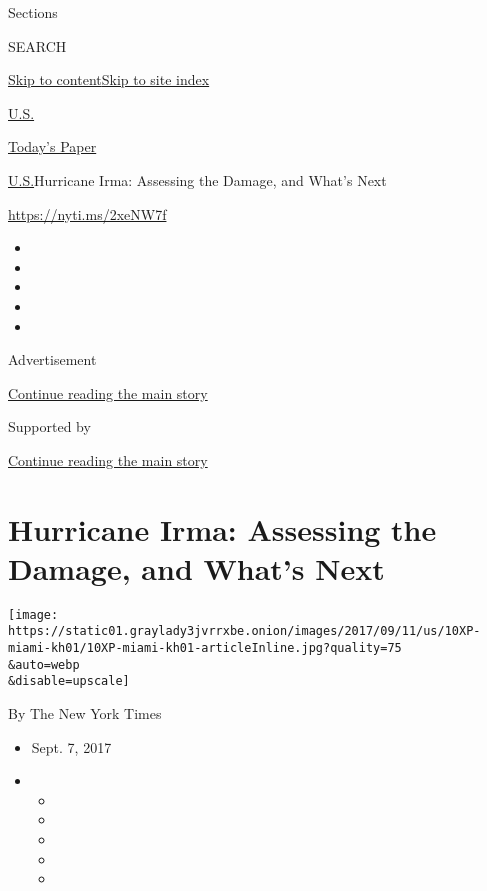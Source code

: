 Sections

SEARCH

\protect\hyperlink{site-content}{Skip to
content}\protect\hyperlink{site-index}{Skip to site index}

\href{https://www.nytimes3xbfgragh.onion/section/us}{U.S.}

\href{https://myaccount.nytimes3xbfgragh.onion/auth/login?response_type=cookie\&client_id=vi}{}

\href{https://www.nytimes3xbfgragh.onion/section/todayspaper}{Today's
Paper}

\href{/section/us}{U.S.}\textbar{}Hurricane Irma: Assessing the Damage,
and What's Next

\url{https://nyti.ms/2xeNW7f}

\begin{itemize}
\item
\item
\item
\item
\item
\end{itemize}

Advertisement

\protect\hyperlink{after-top}{Continue reading the main story}

Supported by

\protect\hyperlink{after-sponsor}{Continue reading the main story}

\hypertarget{hurricane-irma-assessing-the-damage-and-whats-next}{%
\section{Hurricane Irma: Assessing the Damage, and What's
Next}\label{hurricane-irma-assessing-the-damage-and-whats-next}}

\texttt{[image: https://static01.graylady3jvrrxbe.onion/images/2017/09/11/us/10XP-miami-kh01/10XP-miami-kh01-articleInline.jpg?quality=75\\\&auto=webp\\\&disable=upscale]}

By The New York Times

\begin{itemize}
\item
  Sept. 7, 2017
\item
  \begin{itemize}
  \item
  \item
  \item
  \item
  \item
  \end{itemize}
\end{itemize}

